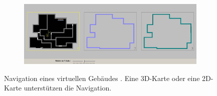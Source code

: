 \begin{figure}[ptb]
	\begin{subfigure}{0.6\textwidth}
		\includegraphics[width=\textwidth]{figures/chittaro2006_2dm.png}
		\caption{}
		\label{sfig:chittaro2006_2dm}
	\end{subfigure}
	\caption{Navigation eines virtuellen Gebäudes . Eine 3D-Karte  oder eine 2D-Karte  unterstützen die Navigation. }
	\label{fig:chittaro2006_maps}
\end{figure}

